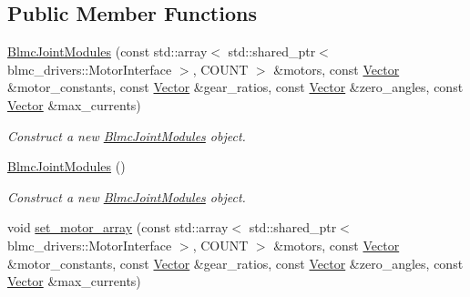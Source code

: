 \subsection*{Public Member Functions}
\begin{DoxyCompactItemize}
\item 
\hyperlink{classblmc__robots_1_1BlmcJointModules_a74910d81a89f9b1713ce8fecc69191fe}{Blmc\+Joint\+Modules} (const std\+::array$<$ std\+::shared\+\_\+ptr$<$ blmc\+\_\+drivers\+::\+Motor\+Interface $>$, C\+O\+U\+NT $>$ \&motors, const \hyperlink{classblmc__robots_1_1BlmcJointModules_abaff382c6fd4b494ec0c17498d94919e}{Vector} \&motor\+\_\+constants, const \hyperlink{classblmc__robots_1_1BlmcJointModules_abaff382c6fd4b494ec0c17498d94919e}{Vector} \&gear\+\_\+ratios, const \hyperlink{classblmc__robots_1_1BlmcJointModules_abaff382c6fd4b494ec0c17498d94919e}{Vector} \&zero\+\_\+angles, const \hyperlink{classblmc__robots_1_1BlmcJointModules_abaff382c6fd4b494ec0c17498d94919e}{Vector} \&max\+\_\+currents)
\begin{DoxyCompactList}\small\item\em Construct a new \hyperlink{classblmc__robots_1_1BlmcJointModules}{Blmc\+Joint\+Modules} object. \end{DoxyCompactList}\item 
\mbox{\label{classblmc__robots_1_1BlmcJointModules_af4c700a8d346ceaebece38928b5e7ca6}} 
\hyperlink{classblmc__robots_1_1BlmcJointModules_af4c700a8d346ceaebece38928b5e7ca6}{Blmc\+Joint\+Modules} ()
\begin{DoxyCompactList}\small\item\em Construct a new \hyperlink{classblmc__robots_1_1BlmcJointModules}{Blmc\+Joint\+Modules} object. \end{DoxyCompactList}\item 
void \hyperlink{classblmc__robots_1_1BlmcJointModules_a905addfe3271be5bc88bd785c5cbb032}{set\+\_\+motor\+\_\+array} (const std\+::array$<$ std\+::shared\+\_\+ptr$<$ blmc\+\_\+drivers\+::\+Motor\+Interface $>$, C\+O\+U\+NT $>$ \&motors, const \hyperlink{classblmc__robots_1_1BlmcJointModules_abaff382c6fd4b494ec0c17498d94919e}{Vector} \&motor\+\_\+constants, const \hyperlink{classblmc__robots_1_1BlmcJointModules_abaff382c6fd4b494ec0c17498d94919e}{Vector} \&gear\+\_\+ratios, const \hyperlink{classblmc__robots_1_1BlmcJointModules_abaff382c6fd4b494ec0c17498d94919e}{Vector} \&zero\+\_\+angles, const \hyperlink{classblmc__robots_1_1BlmcJointModules_abaff382c6fd4b494ec0c17498d94919e}{Vector} \&max\+\_\+currents)

\end{DoxyCompactItemize}
